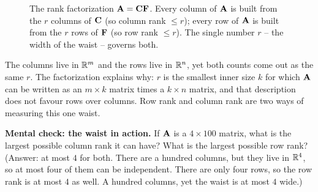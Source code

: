 \begin{figure}[H]
\centering
{}
\caption{The rank factorization $\protect\mathbf{A}=\protect\mathbf{C}\protect\mathbf{F}$.
Every column of $\protect\mathbf{A}$ is built from the $r$ columns of $\protect\mathbf{C}$
(so column rank $\le r$); every row of $\protect\mathbf{A}$ is built from the $r$ rows
of $\protect\mathbf{F}$ (so row rank $\le r$). The single number $r$ -- the width of
the waist -- governs both.}
\label{ch16:rankfac}
\end{figure}

\begin{aestheticbox}
The columns live in $\mathbb{R}^m$ and the rows live in $\mathbb{R}^n$, yet both counts come out
as the same $r$. The factorization explains why: $r$ is the smallest inner size
$k$ for which $\mathbf{A}$ can be written as an $m\times k$ matrix times a
$k\times n$ matrix, and that description does not favour rows over columns.
Row rank and column rank are two ways of measuring this one waist.
\end{aestheticbox}

\begin{labbox}
\textbf{Mental check: the waist in action.}
If $\mathbf{A}$ is a $4 \times 100$ matrix, what is the largest possible column rank
it can have? What is the largest possible row rank?
(Answer: at most $4$ for both. There are a hundred columns, but they live in
$\mathbb{R}^4$, so at most four of them can be independent. There are only four rows, so
the row rank is at most $4$ as well. A hundred columns, yet the waist is at most
$4$ wide.)
\end{labbox}

